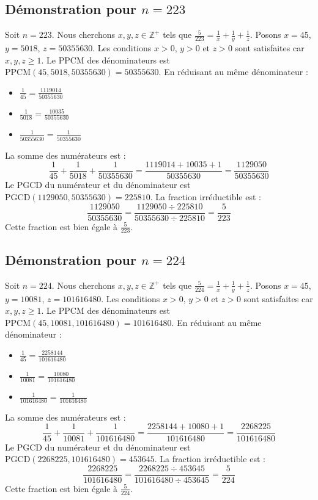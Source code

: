 \documentclass[11pt,a4paper]{article}
\begin{document}
\subsection{Démonstration pour $n = 223$}
Soit $n = 223$. Nous cherchons $x, y, z \in \mathbb{Z}^{+}$ tels que $\frac{5}{223} = \frac{1}{x} + \frac{1}{y} + \frac{1}{z}$.
Posons $x = 45$, $y = 5018$, $z = 50355630$.
Les conditions $x > 0$, $y > 0$ et $z > 0$ sont satisfaites car $x, y, z \geq 1$.
Le PPCM des dénominateurs est $\text{PPCM}(45, 5018, 50355630) = 50355630$.
En réduisant au même dénominateur :
\begin{itemize}
    \item $\frac{1}{45} = \frac{1119014}{50355630}$
    \item $\frac{1}{5018} = \frac{10035}{50355630}$
    \item $\frac{1}{50355630} = \frac{1}{50355630}$
\end{itemize}
La somme des numérateurs est :
$$ \frac{1}{45} + \frac{1}{5018} + \frac{1}{50355630} = \frac{1119014 + 10035 + 1}{50355630} = \frac{1129050}{50355630} $$
Le PGCD du numérateur et du dénominateur est $\text{PGCD}(1129050, 50355630) = 225810$.
La fraction irréductible est :
$$ \frac{1129050}{50355630} = \frac{1129050 \div 225810}{50355630 \div 225810} = \frac{5}{223} $$
Cette fraction est bien égale à $\frac{5}{223}$.

\subsection{Démonstration pour $n = 224$}
Soit $n = 224$. Nous cherchons $x, y, z \in \mathbb{Z}^{+}$ tels que $\frac{5}{224} = \frac{1}{x} + \frac{1}{y} + \frac{1}{z}$.
Posons $x = 45$, $y = 10081$, $z = 101616480$.
Les conditions $x > 0$, $y > 0$ et $z > 0$ sont satisfaites car $x, y, z \geq 1$.
Le PPCM des dénominateurs est $\text{PPCM}(45, 10081, 101616480) = 101616480$.
En réduisant au même dénominateur :
\begin{itemize}
    \item $\frac{1}{45} = \frac{2258144}{101616480}$
    \item $\frac{1}{10081} = \frac{10080}{101616480}$
    \item $\frac{1}{101616480} = \frac{1}{101616480}$
\end{itemize}
La somme des numérateurs est :
$$ \frac{1}{45} + \frac{1}{10081} + \frac{1}{101616480} = \frac{2258144 + 10080 + 1}{101616480} = \frac{2268225}{101616480} $$
Le PGCD du numérateur et du dénominateur est $\text{PGCD}(2268225, 101616480) = 453645$.
La fraction irréductible est :
$$ \frac{2268225}{101616480} = \frac{2268225 \div 453645}{101616480 \div 453645} = \frac{5}{224} $$
Cette fraction est bien égale à $\frac{5}{224}$.
\end{document}
